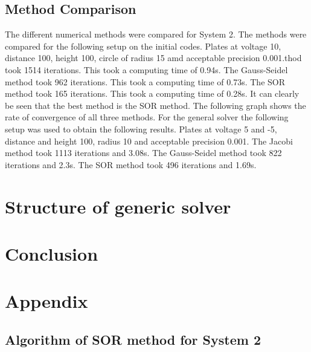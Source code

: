 \documentclass{article}
\begin{document}
	\subsection{Method Comparison}The different numerical methods were compared for System 2. The methods were compared for the following setup on the initial codes. Plates at voltage 10, distance 100, height 100, circle of radius 15 amd acceptable precision 0.001.thod took 1514 iterations. This took a computing time of 0.94s.
	The Gauss-Seidel method took 962 iterations. This took a computing time of 0.73s.
	The SOR method took 165 iterations. This took a computing time of 0.28s.
	It can clearly be seen that the best method is the SOR method.
	The following graph shows the rate of convergence of all three methods.
	For the general solver the following setup was used to obtain the following results. Plates at voltage 5 and -5, distance and height 100, radius 10 and acceptable precision 0.001.
	The Jacobi method took 1113 iterations and 3.08s.
	The Gauss-Seidel method took 822 iterations and 2.3s.
	The SOR method took 496 iterations and 1.69s.
	\section{Structure of generic solver}
	\section{Conclusion}
	\section{Appendix}
	\subsection{Algorithm of SOR method for System 2}
	
\end{document}
